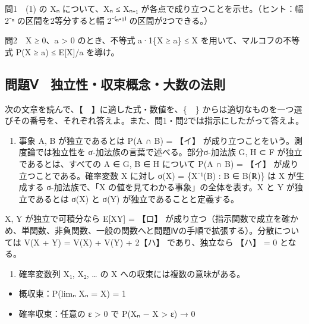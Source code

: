 \documentclass[
  10pt,
  a4paper,
]{article}
\providecommand{\tightlist}{%
  \setlength{\itemsep}{0pt}\setlength{\parskip}{0pt}}
\begin{document}
問1　(1) の X{\fallbackfont ₙ} について、X{\fallbackfont ₙ} ≤
X{\fallbackfont ₙ₊₁} が各点で成り立つことを示せ。（ヒント：幅
2{\fallbackfont ⁻ⁿ} の区間を2等分すると幅
2{\fallbackfont ⁻⁽ⁿ⁺}¹{\fallbackfont ⁾} の区間が2つできる。）

問2　X ≥ 0、a \textgreater{} 0 のとき、不等式 a·1\{X ≥ a\} ≤ X
を用いて、マルコフの不等式 P(X ≥ a) ≤ E{[}X{]}/a を導け。

\hypertarget{ux554fux984cux2174-ux72ecux7acbux6027ux53ceux675fux6982ux5ff5ux5927ux6570ux306eux6cd5ux5247}{%
\subsection{問題Ⅴ　独立性・収束概念・大数の法則}\label{ux554fux984cux2174-ux72ecux7acbux6027ux53ceux675fux6982ux5ff5ux5927ux6570ux306eux6cd5ux5247}}

次の文章を読んで、【　】に適した式・数値を、\{　\}
からは適切なものを一つ選びその番号を、それぞれ答えよ。また、問1・問2では指示にしたがって答えよ。

\begin{enumerate}
\def\labelenumi{(\arabic{enumi})}
\tightlist
\item
  事象 A, B が独立であるとは P(A ∩ B) = 【イ】
  が成り立つことをいう。測度論では独立性を
  σ-加法族の言葉で述べる。部分σ-加法族 G, H ⊂ F
  が独立であるとは、すべての A ∈ G, B ∈ H について P(A ∩ B) = 【イ】
  が成り立つことである。確率変数 X に対し σ(X) =
  \{X{\fallbackfont ⁻}¹(B) : B ∈ B({\fallbackfont ℝ})\} は X が生成する
  σ-加法族で、「X の値を見てわかる事象」の全体を表す。X と Y
  が独立であるとは σ(X) と σ(Y) が独立であることと定義する。
\end{enumerate}

X, Y が独立で可積分なら E{[}XY{]} = 【ロ】
が成り立つ（指示関数で成立を確かめ、単関数、非負関数、一般の関数へと問題Ⅳの手順で拡張する）。分散については
V(X + Y) = V(X) + V(Y) + 2【ハ】 であり、独立なら 【ハ】 = 0 となる。

\begin{enumerate}
\def\labelenumi{(\arabic{enumi})}
\setcounter{enumi}{1}
\tightlist
\item
  確率変数列 X{\fallbackfont ₁}, X{\fallbackfont ₂}, \ldots{} の X
  への収束には複数の意味がある。
\end{enumerate}

\begin{itemize}
\tightlist
\item
  概収束：P(lim{\fallbackfont ₙ} X{\fallbackfont ₙ} = X) = 1
\item
  確率収束：任意の ε \textgreater{} 0 で P(\textbar X{\fallbackfont ₙ} −
  X\textbar{} \textgreater{} ε) → 0
\end{itemize}
\end{document}
